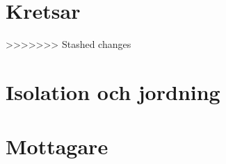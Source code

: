 %

\chapter{Kretsar}

%
%
%
%
%
%
%
%
%
>>>>>>> Stashed changes
%
\chapter[Isolation och jord]{Isolation och jordning}
% 
%
\chapter{Mottagare}
% 
% 
% 
% 
% 
% 
% 
% 
% 
%
